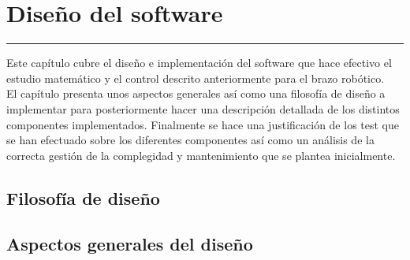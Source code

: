 \chapter{Diseño del software} \label{chap:SW}
\hrule
\vspace{3mm}


Este capítulo cubre el diseño e implementación del software que hace efectivo el estudio matemático y el control descrito anteriormente para el brazo robótico.
\\
El capítulo presenta unos aspectos generales así como una filosofía de diseño a implementar para posteriormente hacer una descripción detallada de los distintos componentes implementados. Finalmente se hace una justificación de los test que se han efectuado sobre los diferentes componentes así como un análisis de la correcta gestión de la complegidad y mantenimiento que se plantea inicialmente.

\section{Filosofía de diseño} \label{sec:SW:filosofia_diseño}


\section{Aspectos generales del diseño} \label{sec:SW:diseño_general}

